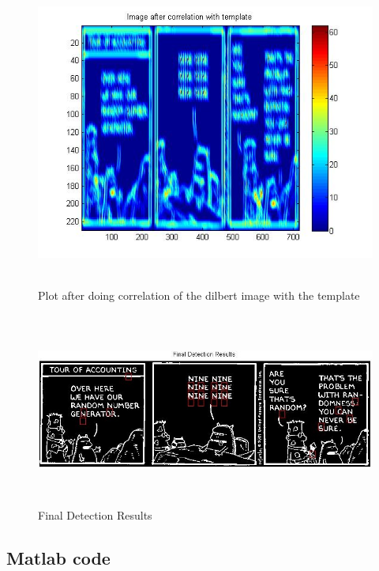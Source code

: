 \documentclass[11pt,psfig]{article}
\begin{document}
\begin{figure}[H]
\centering
\includegraphics[height=4in]{prob8plot_afterCorrelation.jpg}
\caption{Plot after doing correlation of the dilbert image with the template}
\end{figure}

\begin{figure}[H]
\centering
\includegraphics[height=2.5in]{prob8plot_finalDetection.jpg}
\caption{Final Detection Results}
\end{figure}

\subsection*{Matlab code}
\end{document}
